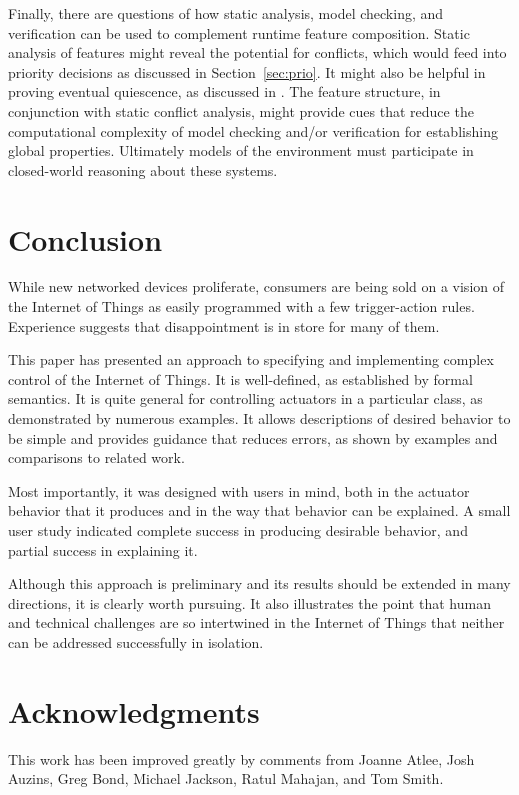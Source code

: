 \documentclass[conference]{IEEEtran}
\begin{document}
Finally, there are questions of how static analysis,
model checking, and verification
can be used to complement runtime feature composition.
Static analysis of features might reveal the potential for
conflicts, which would feed into priority decisions as discussed
in Section~\ref{sec:prio}.
It might also be helpful in proving eventual quiescence, as discussed
in \cite{pfcTR}.
The feature structure, in conjunction with
static conflict analysis, might provide
cues that reduce the computational complexity of model checking and/or
verification for establishing global properties.
Ultimately models of the environment must participate in closed-world
reasoning about these systems.

\section{Conclusion}

While new networked devices proliferate, consumers are being sold
on a vision of the Internet of Things as easily programmed with a few
trigger-action rules.
Experience suggests that disappointment is in store for many of them.

This paper has presented an approach to specifying and implementing
complex control of the Internet of Things.
It is well-defined, as established by formal semantics.
It is quite general for controlling actuators in a particular
class, as demonstrated by numerous examples.
It allows descriptions of desired behavior to be simple and provides
guidance that reduces errors, as shown by examples and comparisons
to related work.

Most importantly, it was designed with users in mind, both in the
actuator behavior that it produces and in the way that behavior can
be explained.
A small user study indicated complete success in producing desirable
behavior, and partial success in explaining it.

Although this approach is preliminary and its results should be extended
in many directions, it is clearly 
worth pursuing.
It also illustrates the point that human and technical challenges
are so intertwined in the Internet of Things that neither can be addressed
successfully in isolation.

\section*{Acknowledgments}

This work has been improved greatly by comments from Joanne Atlee,
Josh Auzins, Greg Bond, Michael Jackson, Ratul Mahajan, and Tom Smith.



\end{document}
